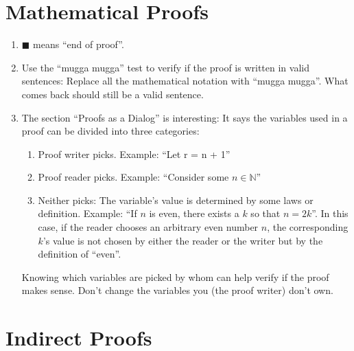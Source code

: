 \documentclass[12pt, letterpaper, oneside]{book}
\begin{document}
%
%

\chapter{Mathematical Proofs}

\begin{enumerate}
  \item $\blacksquare$ means ``end of proof''.
  \item Use the ``mugga mugga'' test to verify if the proof is written in valid
        sentences: Replace all the mathematical notation with ``mugga mugga''. What
        comes back should still be a valid sentence.
  \item The section ``Proofs as a Dialog'' is interesting: It says the variables
        used in a proof can be divided into three categories:
        \begin{enumerate}
          \item Proof writer picks. Example: ``Let r = n + 1''
          \item Proof reader picks. Example: ``Consider some $n \in \mathbb{N}$''
          \item Neither picks: The variable's value is determined by some laws or
                definition. Example: ``If $n$ is even, there exists a $k$ so that $n =
                  2k$''. In this case, if the reader chooses an arbitrary even number $n$,
                the corresponding $k$'s value is not chosen by either the reader or the
                writer but by the definition of ``even''.
        \end{enumerate}
        Knowing which variables are picked by whom can help verify if the proof
        makes sense. Don't change the variables you (the proof writer) don't own.
\end{enumerate}

%
%

\chapter{Indirect Proofs}

\end{document}
